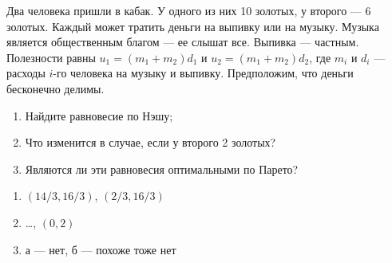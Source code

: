 \begin{problem}
 Два человека пришли в кабак. У одного из них 10 золотых, у второго
— 6 золотых. Каждый может тратить деньги на выпивку или на музыку.
Музыка является общественным благом — ее слышат все. Выпивка —
частным. Полезности равны $u_{1}=(m_{1}+m_{2})d_{1}$ и
$u_{2}=(m_{1}+m_{2})d_{2}$, где $m_{i}$ и $d_{i}$ — расходы $i$-го
человека на музыку и выпивку. Предположим, что деньги бесконечно
делимы. \par
\begin{enumerate}
\item Найдите равновесие по Нэшу; \par
\item Что изменится в случае, если у второго 2 золотых? \par
\item  Являются ли эти равновесия оптимальными по Парето?
\end{enumerate}


\begin{sol}
\begin{enumerate}
\item $(14/3,16/3)$, $(2/3,16/3)$ \par
\item \ldots, $(0,2)$ \par
\item  а — нет, б — похоже тоже нет
\end{enumerate}
\end{sol}
\end{problem}



